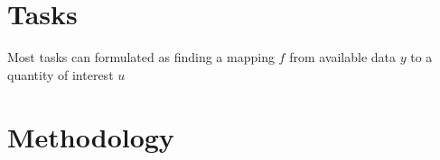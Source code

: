 \begin{bibunit}
%
%
%
%
%
\section*{Tasks}
  Most tasks can formulated as finding a mapping $f$ from available data $y$ to a quantity of interest $u$

\section*{Methodology}




\end{bibunit}
